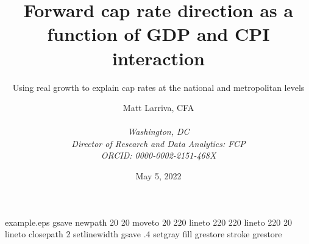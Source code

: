 \begin{filecontents*}{example.eps}
gsave
newpath
  20 20 moveto
  20 220 lineto
  220 220 lineto
  220 20 lineto
closepath
2 setlinewidth
gsave
  .4 setgray fill
grestore
stroke
grestore
\end{filecontents*}

\RequirePackage{fix-cm}
\documentclass{svjour3}                     %
\smartqed  %
\usepackage{graphicx}


\usepackage{natbib}
\usepackage{csvsimple}
\usepackage{breakcites}
\usepackage{caption}
\usepackage{blindtext}
\usepackage{amsmath}
\usepackage{float}
\usepackage{graphicx}
\usepackage{geometry}
\usepackage{longtable,array}
\usepackage{subfig}
\usepackage{graphicx}
\usepackage{url}
\captionsetup[figure]{font=normalsize}
\usepackage{pdflscape}
\usepackage [english]{babel}
\usepackage [autostyle, english = american]{csquotes}



\title{Forward cap rate direction as a function of GDP and CPI interaction}
\date{May 5, 2022}
\subtitle{Using real growth to explain cap rates at the national and metropolitan levels}
\author{Matt Larriva, CFA         \\
              \\
             \emph{Washington, DC}   \\
             \emph{Director of Research and Data Analytics: FCP}\\ %
             \emph{ORCID: 0000-0002-2151-468X}
}





\maketitle

